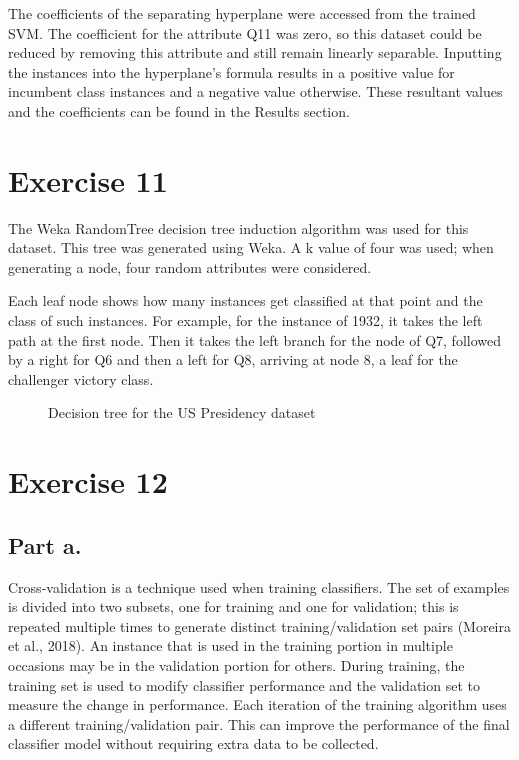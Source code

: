 \documentclass[11pt, a4paper]{article}
\begin{document}
The coefficients of the separating hyperplane were accessed from the trained SVM. The coefficient for the attribute Q11 was zero, so this dataset could be reduced by removing this attribute and still remain linearly separable. Inputting the instances into the hyperplane's formula results in a positive value for incumbent class instances and a negative value otherwise. These resultant values and the coefficients can be found in the Results section.

\section{Exercise 11}

The Weka RandomTree decision tree induction algorithm was used for this dataset. This tree was generated using Weka. A k value of four was used; when generating a node, four random attributes were considered.

Each leaf node shows how many instances get classified at that point and the class of such instances. For example, for the instance of 1932, it takes the left path at the first node. Then it takes the left branch for the node of Q7, followed by a right for Q6 and then a left for Q8, arriving at node 8, a leaf for the challenger victory class.

\begin{figure}[H]
\caption{Decision tree for the US Presidency dataset}\label{fig11}
\end{figure}

\section{Exercise 12}
\subsection{Part a.}
Cross-validation is a technique used when training classifiers. The set of examples is divided into two subsets, one for training and one for validation; this is repeated multiple times to generate distinct training/validation set pairs (Moreira et al., 2018). An instance that is used in the training portion in multiple occasions may be in the validation portion for others. During training, the training set is used to modify classifier performance and the validation set to measure the change in performance. Each iteration of the training algorithm uses a different training/validation pair. This can improve the performance of the final classifier model without requiring extra data to be collected.
\end{document}
